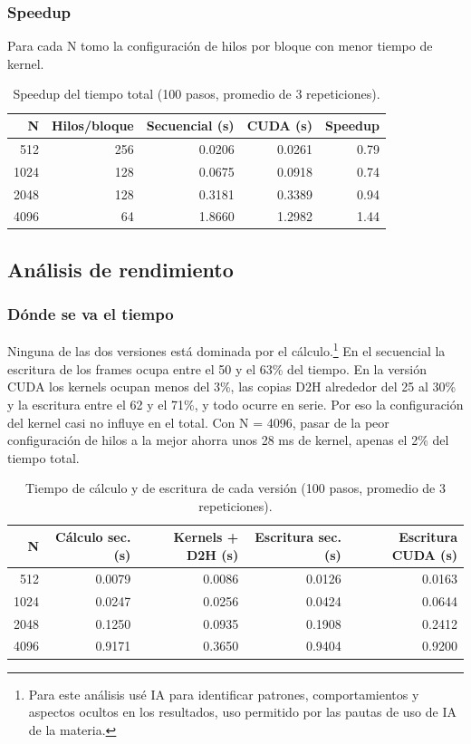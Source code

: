 \subsubsection*{Speedup}

Para cada N tomo la configuración de hilos por bloque con menor tiempo de kernel.

\begin{table}[H]
  \centering
  \begin{tabular}{rrrrr}
    \toprule
    N & Hilos/bloque & Secuencial (s) & CUDA (s) & Speedup \\
    \midrule
    512  & 256 & 0.0206 & 0.0261 & 0.79 \\
    1024 & 128 & 0.0675 & 0.0918 & 0.74 \\
    2048 & 128 & 0.3181 & 0.3389 & 0.94 \\
    4096 & 64  & 1.8660 & 1.2982 & 1.44 \\
    \bottomrule
  \end{tabular}
  \caption{Speedup del tiempo total (100 pasos, promedio de 3 repeticiones).}
  \label{tab:speedup}
\end{table}

\subsection{Análisis de rendimiento}

\subsubsection*{Dónde se va el tiempo}

Ninguna de las dos versiones está dominada por el cálculo.\footnote{Para este análisis usé IA para identificar patrones, comportamientos y aspectos ocultos en los resultados, uso permitido por las pautas de uso de IA de la materia.} En el secuencial la escritura de los frames ocupa entre el 50 y el 63\% del tiempo. En la versión CUDA los kernels ocupan menos del 3\%, las copias D2H alrededor del 25 al 30\% y la escritura entre el 62 y el 71\%, y todo ocurre en serie. Por eso la configuración del kernel casi no influye en el total. Con N = 4096, pasar de la peor configuración de hilos a la mejor ahorra unos 28 ms de kernel, apenas el 2\% del tiempo total.


\begin{table}[H]
  \centering
  \begin{tabular}{rrrrr}
    \toprule
    N & Cálculo sec. (s) & Kernels + D2H (s) & Escritura sec. (s) & Escritura CUDA (s) \\
    \midrule
    512  & 0.0079 & 0.0086 & 0.0126 & 0.0163 \\
    1024 & 0.0247 & 0.0256 & 0.0424 & 0.0644 \\
    2048 & 0.1250 & 0.0935 & 0.1908 & 0.2412 \\
    4096 & 0.9171 & 0.3650 & 0.9404 & 0.9200 \\
    \bottomrule
  \end{tabular}
  \caption{Tiempo de cálculo y de escritura de cada versión (100 pasos, promedio de 3 repeticiones).}
  \label{tab:descomposicion}
\end{table}

